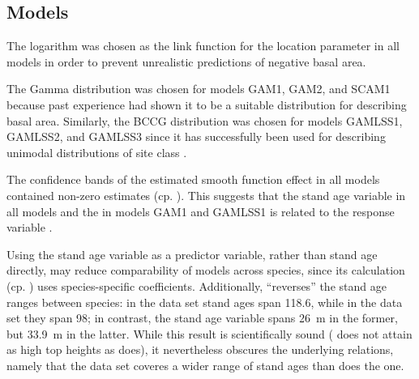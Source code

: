 \subsection{Models}

The logarithm was chosen as the link function for the location parameter in all models in order to prevent unrealistic predictions of negative basal area.

The Gamma distribution was chosen for models GAM1, GAM2, and SCAM1 because past experience had shown it to be a suitable distribution for describing basal area.  Similarly, the BCCG distribution was chosen for models GAMLSS1, GAMLSS2, and GAMLSS3 since it has successfully been used for describing unimodal distributions of site class \parencite{Woerdehoff2016,Albert2009}.

The confidence bands of the estimated smooth function effect in all models contained non-zero estimates (cp. ).  This suggests that the stand age variable in all models and the \ProductivityIndexVariableText{} in models GAM1 and GAMLSS1 is related to the response variable \parencite{Wood2001}.

Using the stand age variable as a predictor variable, rather than stand age directly, may reduce comparability of models across species, since its calculation (cp. ) uses species-specific coefficients. Additionally,  ``reverses'' the stand age ranges between species:  in the \Beech{} data set stand ages span \SI{118.6}{\year}, while in the \Spruce{} data set they span \SI{98}{\year};  in contrast, the stand age variable spans \SI{26}{\meter} in the former, but \SI{33.9}{\meter} in the latter.  While this result is scientifically sound (\Beech{} does not attain as high top heights as \Spruce{} does), it nevertheless obscures the underlying relations, namely that the \Beech{} data set coveres a wider range of stand ages than does the \Spruce{} one.

